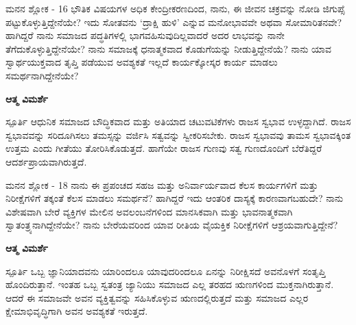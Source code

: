 
\newpage
\begin{mananam}{\mananamfont ಮನನ ಶ್ಲೋಕ - \textenglish{16}}
\footnotesize \mananamtext
 ಭೌತಿಕ ವಿಷಯಗಳ ಅಧಿಕ ಕೇಂದ್ರೀಕರಣದಿಂದ, ನಾನು, ಈ ಜೀವನ ಚಕ್ರವನ್ನು ನೋಡಿ ಜಿಗುಪ್ಸೆ ಪಟ್ಟುಕೊಳ್ಳುತ್ತಿದ್ದೇನೆಯೇ? ಇದು ಸೋತವನು ‘ದ್ರಾಕ್ಷಿ ಹುಳಿ’ ಎನ್ನುವ ಮನೋಭಾವವೇ ಅಥವಾ ಸೋಮಾರಿತನವೇ?ಹಾಗಿದ್ದರೆ ನಾನು ಸಮಾಜದ ಪದ್ಧತಿಗಳಲ್ಲಿ ಭಾಗವಹಿಸುವುದಿಲ್ಲವಾದರೆ ಅದರ ಲಾಭವನ್ನು ನಾನೇ ತೆಗೆದುಕೊಳ್ಳುತ್ತಿದ್ದೇನೆಯೇ? ನಾನು ಸಮಾಜಕ್ಕೆ ಧನಾತ್ಮಕವಾದ ಕೊಡುಗೆಯನ್ನು ನೀಡುತ್ತಿದ್ದೇನೆಯೆ? ನಾನು ಯಾವ ಸ್ವಾರ್ಥಯುಕ್ತವಾದ ತೃಪ್ತಿ ಪಡೆಯುವ ಅವಶ್ಯಕತೆ ಇಲ್ಲದೆ ಕಾರ್ಯಕ್ಕೋಸ್ಕರ ಕಾರ್ಯ ಮಾಡಲು ಸಮರ್ಥನಾಗಿದ್ದೇನೆಯೇ?
\end{mananam}
\WritingHand\enspace\textbf{ಆತ್ಮ ವಿಮರ್ಶೆ}\\
\begin{inspiration}{\mananamfont ಸ್ಪೂರ್ತಿ}
\footnotesize \mananamtext ಆಧುನಿಕ ಸಮಾಜದ ಬೌದ್ಧಿಕವಾದ ಮತ್ತು ಅತಿಯಾದ ಚಟುವಟಿಕೆಗಳು ರಾಜಸ ಸ್ವಭಾವ ಉಳ್ಳದ್ದಾಗಿದೆ. ರಾಜಸ ಸ್ವಭಾವವನ್ನು ಸರಿದೂಗಿಸಲು ತಮಸ್ಸನ್ನು ವರ್ಜಿಸಿ ಸತ್ವವನ್ನು ಸ್ವೀಕರಿಸಬೇಕು. ರಾಜಸ ಸ್ವಭಾವವು ತಾಮಸ ಸ್ವಭಾವಕ್ಕಿಂತ ಉತ್ತಮ ಎಂದು ಗೀತೆಯು ತೋರಿಸಿಕೊಡುತ್ತದೆ. ಹಾಗೆಯೇ ರಾಜಸ ಗುಣವು ಸತ್ವ ಗುಣದೊಂದಿಗೆ ಬೆರೆತಿದ್ದರೆ ಆದರ್ಶಪ್ರಾಯವಾಗಿರುತ್ತದೆ.
\end{inspiration}
\newpage


\newpage
\begin{mananam}{\mananamfont ಮನನ ಶ್ಲೋಕ - \textenglish{18}}
\footnotesize \mananamtext ನಾನು ಈ ಪ್ರಪಂಚದ ಸಹಜ ಮತ್ತು ಅನಿರ್ವಾರ್ಯವಾದ ಕೆಲಸ ಕಾರ್ಯಗಳಿಗೆ ಮತ್ತು ನಿರೀಕ್ಷೆಗಳಿಗೆ ತಕ್ಕಂತೆ ಕೆಲಸ ಮಾಡಲು ಸಮರ್ಥನೆ? ಹಾಗಿದ್ದರೆ ಇದು ಆಂತರಿಕ ದಾಸ್ಯಕ್ಕೆ ಕಾರಣವಾಗಬಹುದೇ? ನಾನು ವಿಶೇಷವಾಗಿ ಬೇರೆ ವ್ಯಕ್ತಿಗಳ ಮೇಲಿನ ಅವಲಂಬನೆಗಳಿಂದ ಮಾನಸಿಕವಾಗಿ ಮತ್ತು ಭಾವನಾತ್ಮಕವಾಗಿ ಸ್ವಾತಂತ್ರ್ಯನಾಗಿದ್ದೇನೆಯೇ? ನಾನು ಬೇರೆಯವರಿಂದ ಯಾವ ರೀತಿಯ ವೈಯಕ್ತಿಕ ನಿರೀಕ್ಷೆಗಳಿಗೆ ಆಶ್ರಯವಾಗುತ್ತಿದ್ದೇನೆ?
\end{mananam}
\WritingHand\enspace\textbf{ಆತ್ಮ ವಿಮರ್ಶೆ}\\
\begin{inspiration}{\mananamfont ಸ್ಪೂರ್ತಿ}
\footnotesize \mananamtext ಒಬ್ಬ ಜ್ಞಾನಿಯಾದವನು ಯಾರಿಂದಲೂ ಯಾವುದರಿಂದಲೂ ಏನನ್ನು ನಿರೀಕ್ಷಿಸದೆ ಅವನೊಳಗೆ ಸಂತೃಪ್ತಿ ಹೊಂದಿರುತ್ತಾನೆ. ಇಂತಹ ಒಬ್ಬ ಸ್ವತಂತ್ರ ಜ್ಯಾನಿಯು ಸಮಾಜದ ಎಲ್ಲ ತರಹದ ಋಣಗಳಿಂದ ಮುಕ್ತನಾಗಿರುತ್ತಾನೆ. ಆದರೆ ಈ ಸಮಾಜವೇ ಅವನ ವ್ಯಕ್ತಿತ್ವವನ್ನು ಸಹಿಸಿಕೊಳ್ಳುವ ಋಣದಲ್ಲಿರುತ್ತದೆ ಮತ್ತು ಸಮಾಜದ ಎಲ್ಲರ ಕ್ಷೇಮಾಭಿವೃದ್ಧಿಗಾಗಿ ಅವನ ಅವಶ್ಯಕತೆ ಇರುತ್ತದೆ.
\end{inspiration}
\newpage


